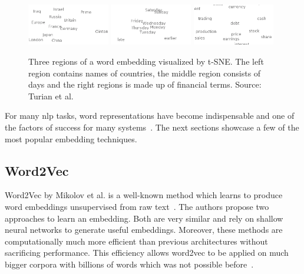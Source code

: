 \begin{figure}[ht]
    \centering
    \includegraphics[width=0.32\textwidth]{figures/03_theory/03_wordEmbeddings1}
    \includegraphics[width=0.32\textwidth]{figures/03_theory/03_wordEmbeddings2}
    \includegraphics[width=0.32\textwidth]{figures/03_theory/03_wordEmbeddings3}
    \caption[Three regions of a word embedding visualized by t-SNE. Source: Turian et al.~\cite{Turian2010} -- Source for full image \url{http://metaoptimize.s3.amazonaws.com/cw-embeddings-ACL2010/embeddings-mostcommon.EMBEDDING_SIZE=50.png}]{Three regions of a word embedding visualized by t-SNE. The left region contains names of countries, the middle region consists of days and the right regions is made up of financial terms. Source: Turian et al.~\cite{Turian2010}\protect\footnotemark}
    \label{fig:03_WordEmbeddings}
\end{figure}

For many \gls{nlp} tasks, word representations have become indispensable and one of the factors of success for many systems~\cite{Luong2013}. The next sections showcase a few of the most popular embedding techniques.

\subsection{Word2Vec}
\label{sec:03_word2vec}

Word2Vec by Mikolov et al. is a well-known method which learns to produce word embeddings unsupervised from raw text~\cite{Mikolov2013}. The authors propose two approaches to learn an embedding. Both are very similar and rely on shallow neural networks to generate useful embeddings. Moreover, these methods are computationally much more efficient than previous architectures without sacrificing performance. This efficiency allows word2vec to be applied on much bigger corpora with billions of words which was not possible before~\cite{Mikolov2013c}.


